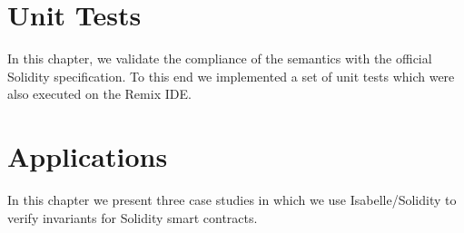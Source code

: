 \documentclass[10pt,DIV17,a4paper,abstract=true,twoside=semi,openright]
{scrreprt}
\begin{document}


\chapter{Unit Tests}

In this chapter, we validate the compliance of the semantics with the official Solidity specification.
To this end we implemented a set of unit tests which were also executed on the Remix IDE.





\chapter{Applications}

In this chapter we present three case studies in which we use Isabelle/Solidity to verify
invariants for Solidity smart contracts.
















\end{document}
